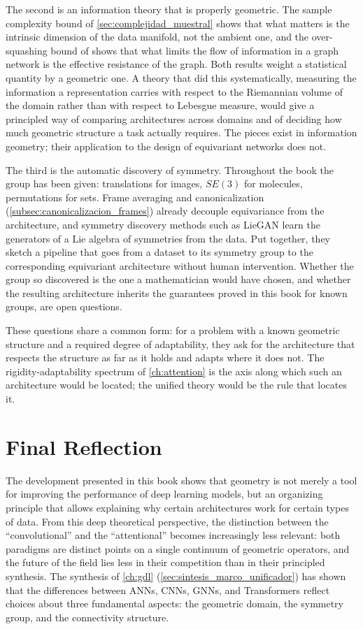 The second is an information theory that is properly geometric. The sample complexity bound of \autoref{sec:complejidad_muestral} shows that what matters is the intrinsic dimension of the data manifold, not the ambient one, and the over-squashing bound of \citet{digiovanni2023oversquashing} shows that what limits the flow of information in a graph network is the effective resistance of the graph. Both results weight a statistical quantity by a geometric one. A theory that did this systematically, measuring the information a representation carries with respect to the Riemannian volume of the domain rather than with respect to Lebesgue measure, would give a principled way of comparing architectures across domains and of deciding how much geometric structure a task actually requires. The pieces exist in information geometry; their application to the design of equivariant networks does not.

The third is the automatic discovery of symmetry. Throughout the book the group has been given: translations for images, $SE(3)$ for molecules, permutations for sets. Frame averaging and canonicalization (\autoref{subsec:canonicalizacion_frames}) already decouple equivariance from the architecture, and symmetry discovery methods such as LieGAN \citep{yang2023liegan} learn the generators of a Lie algebra of symmetries from the data. Put together, they sketch a pipeline that goes from a dataset to its symmetry group to the corresponding equivariant architecture without human intervention. Whether the group so discovered is the one a mathematician would have chosen, and whether the resulting architecture inherits the guarantees proved in this book for known groups, are open questions.

These questions share a common form: for a problem with a known geometric structure and a required degree of adaptability, they ask for the architecture that respects the structure as far as it holds and adapts where it does not. The rigidity-adaptability spectrum of \autoref{ch:attention} is the axis along which such an architecture would be located; the unified theory would be the rule that locates it.


\section{Final Reflection}

The development presented in this book shows that geometry is not merely a tool for improving the performance of deep learning models, but an organizing principle that allows explaining why certain architectures work for certain types of data. From this deep theoretical perspective, the distinction between the ``convolutional'' and the ``attentional'' becomes increasingly less relevant: both paradigms are distinct points on a single continuum of geometric operators, and the future of the field lies less in their competition than in their principled synthesis. The synthesis of \autoref{ch:gdl} (\autoref{sec:sintesis_marco_unificador}) has shown that the differences between \glspl{ANN}, \glspl{CNN}, \glspl{GNN}, and \glspl{Transformer} reflect choices about three fundamental aspects: the geometric domain, the symmetry group, and the connectivity structure.

